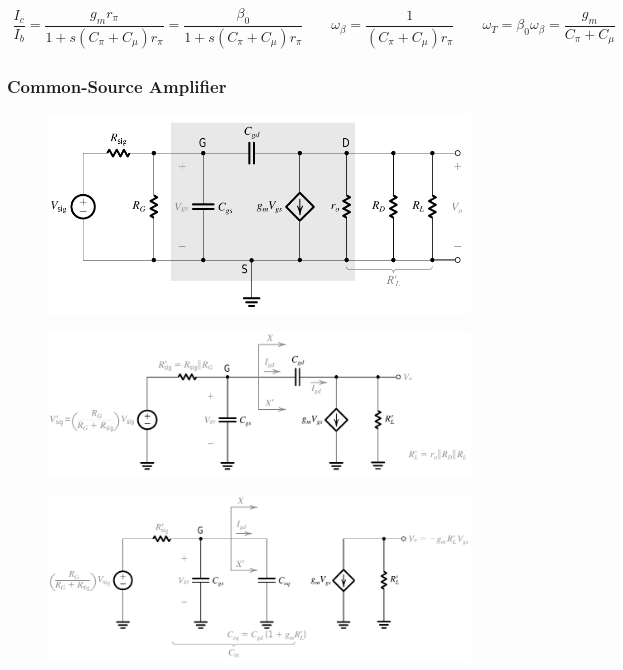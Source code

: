 \begin{equation*}
  \begin{aligned}
    \dfrac{I_c}{I_b} = \dfrac{g_m r_{\pi}}{1 + s \left( C_{\pi} + C_{\mu} \right) r_{\pi}} = \dfrac{\beta_0}{1 + s \left( C_{\pi} + C_{\mu} \right) r_{\pi}} \quad\quad \omega_{\beta} = \dfrac{1}{\left( C_{\pi} + C_{\mu} \right) r_{\pi}} \quad\quad \omega_T = \beta_0 \omega_{\beta} = \dfrac{g_m}{C_{\pi} + C_{\mu}}     
  \end{aligned}
\end{equation*}

\subsubsection{Common-Source Amplifier}

\begin{figure}[H]
  \centering
  \includegraphics[width=0.9\linewidth]{figures/Frequency-Response-CS-High-1}
\end{figure}

\begin{figure}[H]
  \centering
  \includegraphics[width=0.9\linewidth]{figures/Frequency-Response-CS-High-2}
\end{figure}

\begin{figure}[H]
  \centering
  \includegraphics[width=\linewidth]{figures/Frequency-Response-CS-High-3}
\end{figure}

